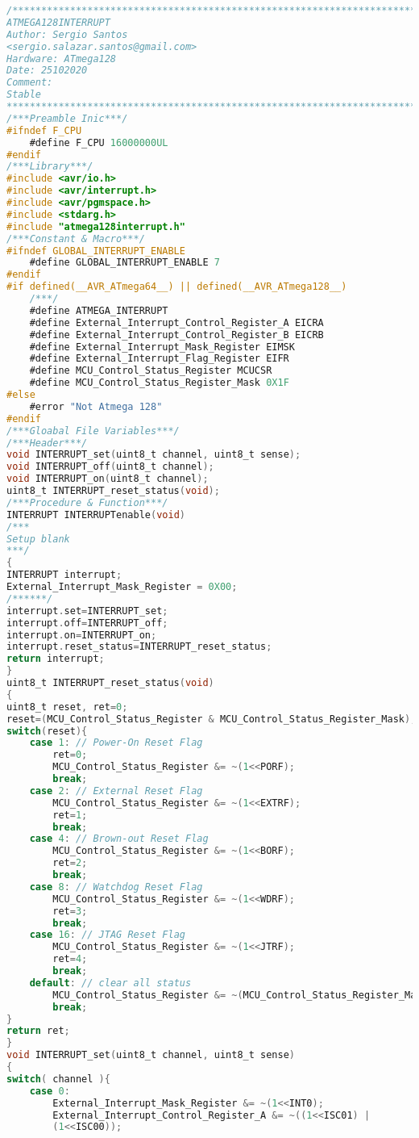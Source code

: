 \begin{lstlisting}[language=C]
/*************************************************************************
ATMEGA128INTERRUPT
Author: Sergio Santos 
<sergio.salazar.santos@gmail.com>
Hardware: ATmega128
Date: 25102020
Comment:
Stable
*************************************************************************/
/***Preamble Inic***/
#ifndef F_CPU
	#define F_CPU 16000000UL
#endif
/***Library***/
#include <avr/io.h>
#include <avr/interrupt.h>
#include <avr/pgmspace.h>
#include <stdarg.h>
#include "atmega128interrupt.h"
/***Constant & Macro***/
#ifndef GLOBAL_INTERRUPT_ENABLE
	#define GLOBAL_INTERRUPT_ENABLE 7
#endif
#if defined(__AVR_ATmega64__) || defined(__AVR_ATmega128__)	
	/***/
	#define ATMEGA_INTERRUPT
	#define External_Interrupt_Control_Register_A EICRA
	#define External_Interrupt_Control_Register_B EICRB
	#define External_Interrupt_Mask_Register EIMSK
	#define External_Interrupt_Flag_Register EIFR
	#define MCU_Control_Status_Register MCUCSR
	#define MCU_Control_Status_Register_Mask 0X1F
#else
	#error "Not Atmega 128"
#endif
/***Gloabal File Variables***/
/***Header***/
void INTERRUPT_set(uint8_t channel, uint8_t sense);
void INTERRUPT_off(uint8_t channel);
void INTERRUPT_on(uint8_t channel);
uint8_t INTERRUPT_reset_status(void);
/***Procedure & Function***/
INTERRUPT INTERRUPTenable(void)
/***
Setup blank
***/
{
INTERRUPT interrupt;
External_Interrupt_Mask_Register = 0X00;
/******/
interrupt.set=INTERRUPT_set;
interrupt.off=INTERRUPT_off;
interrupt.on=INTERRUPT_on;
interrupt.reset_status=INTERRUPT_reset_status;
return interrupt;
}
uint8_t INTERRUPT_reset_status(void)
{
uint8_t reset, ret=0;
reset=(MCU_Control_Status_Register & MCU_Control_Status_Register_Mask);
switch(reset){
	case 1: // Power-On Reset Flag
		ret=0;
		MCU_Control_Status_Register &= ~(1<<PORF);
		break;
	case 2: // External Reset Flag
		MCU_Control_Status_Register &= ~(1<<EXTRF);
		ret=1;
		break;
	case 4: // Brown-out Reset Flag
		MCU_Control_Status_Register &= ~(1<<BORF);
		ret=2;
		break;
	case 8: // Watchdog Reset Flag
		MCU_Control_Status_Register &= ~(1<<WDRF);
		ret=3;
		break;
	case 16: // JTAG Reset Flag
		MCU_Control_Status_Register &= ~(1<<JTRF);
		ret=4;
		break;
	default: // clear all status
		MCU_Control_Status_Register &= ~(MCU_Control_Status_Register_Mask);
		break;
}
return ret;
}
void INTERRUPT_set(uint8_t channel, uint8_t sense)
{
switch( channel ){
	case 0: 
		External_Interrupt_Mask_Register &= ~(1<<INT0);
		External_Interrupt_Control_Register_A &= ~((1<<ISC01) |
		(1<<ISC00));

\end{lstlisting}
